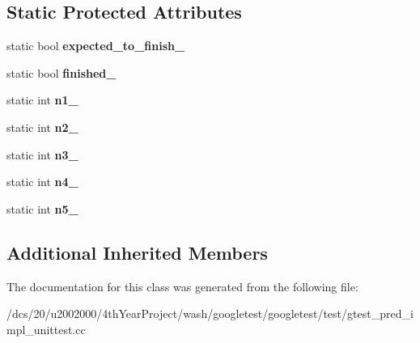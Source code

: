 \subsection*{Static Protected Attributes}
\begin{DoxyCompactItemize}
\item 
\mbox{\label{classPredicate5Test_aa502b7a330cc5c64785ff59aad3ef180}} 
static bool {\bfseries expected\+\_\+to\+\_\+finish\+\_\+}
\item 
\mbox{\label{classPredicate5Test_a5003aada64accf06cdb28b1ff1797353}} 
static bool {\bfseries finished\+\_\+}
\item 
\mbox{\label{classPredicate5Test_a356c8e361185b234a417ed895eb14e38}} 
static int {\bfseries n1\+\_\+}
\item 
\mbox{\label{classPredicate5Test_a5bf48ba65b7baf20abe1d2af90779ce0}} 
static int {\bfseries n2\+\_\+}
\item 
\mbox{\label{classPredicate5Test_a63723efb915dbf418c31b97b64dabc0e}} 
static int {\bfseries n3\+\_\+}
\item 
\mbox{\label{classPredicate5Test_a5d66aa58badddc8d3d8070a93c0558d6}} 
static int {\bfseries n4\+\_\+}
\item 
\mbox{\label{classPredicate5Test_a96badba6366235a2771b27ea014bd9ce}} 
static int {\bfseries n5\+\_\+}
\end{DoxyCompactItemize}
\subsection*{Additional Inherited Members}


The documentation for this class was generated from the following file\+:\begin{DoxyCompactItemize}
\item 
/dcs/20/u2002000/4th\+Year\+Project/wash/googletest/googletest/test/gtest\+\_\+pred\+\_\+impl\+\_\+unittest.\+cc\end{DoxyCompactItemize}
